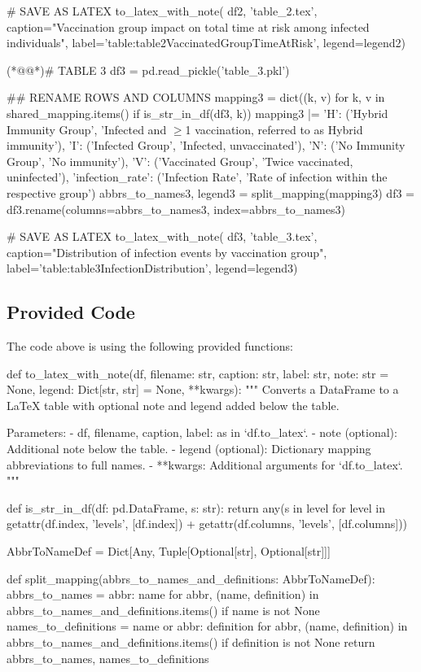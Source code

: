 \documentclass[11pt]{article}
\begin{document}
\begin{python}
# SAVE AS LATEX
to_latex_with_note(
    df2, 'table_2.tex',
    caption="Vaccination group impact on total time at risk among infected individuals", 
    label='table:table2VaccinatedGroupTimeAtRisk',
    legend=legend2)

(*@@*)# TABLE 3
df3 = pd.read_pickle('table_3.pkl')

## RENAME ROWS AND COLUMNS
mapping3 = dict((k, v) for k, v in shared_mapping.items() if is_str_in_df(df3, k)) 
mapping3 |= {
    'H': ('Hybrid Immunity Group', 'Infected and $\geq$1 vaccination, referred to as Hybrid immunity'),
    'I': ('Infected Group', 'Infected, unvaccinated'),
    'N': ('No Immunity Group', 'No immunity'),
    'V': ('Vaccinated Group', 'Twice vaccinated, uninfected'),
    'infection_rate': ('Infection Rate', 'Rate of infection within the respective group')
}
abbrs_to_names3, legend3 = split_mapping(mapping3)
df3 = df3.rename(columns=abbrs_to_names3, index=abbrs_to_names3)

# SAVE AS LATEX
to_latex_with_note(
    df3, 'table_3.tex',
    caption="Distribution of infection events by vaccination group", 
    label='table:table3InfectionDistribution',
    legend=legend3)

\end{python}

\subsection{Provided Code}
The code above is using the following provided functions:

\begin{python}
def to_latex_with_note(df, filename: str, caption: str, label: str, note: str = None, legend: Dict[str, str] = None, **kwargs):
    """
    Converts a DataFrame to a LaTeX table with optional note and legend added below the table.

    Parameters:
    - df, filename, caption, label: as in `df.to_latex`.
    - note (optional): Additional note below the table.
    - legend (optional): Dictionary mapping abbreviations to full names.
    - **kwargs: Additional arguments for `df.to_latex`.
    """

def is_str_in_df(df: pd.DataFrame, s: str):
    return any(s in level for level in getattr(df.index, 'levels', [df.index]) + getattr(df.columns, 'levels', [df.columns]))

AbbrToNameDef = Dict[Any, Tuple[Optional[str], Optional[str]]]

def split_mapping(abbrs_to_names_and_definitions: AbbrToNameDef):
    abbrs_to_names = {abbr: name for abbr, (name, definition) in abbrs_to_names_and_definitions.items() if name is not None}
    names_to_definitions = {name or abbr: definition for abbr, (name, definition) in abbrs_to_names_and_definitions.items() if definition is not None}
    return abbrs_to_names, names_to_definitions

\end{python}
\end{document}
